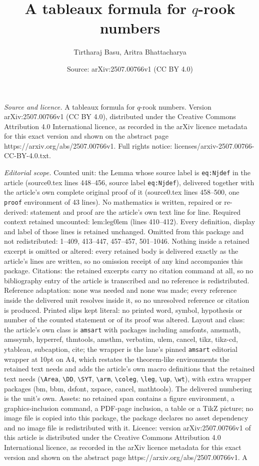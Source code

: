 \documentclass[10pt,a4paper]{amsart}
\title[A tableaux formula for $q$-rook numbers]{A tableaux formula for $q$-rook numbers}
\author{Tirtharaj Basu, Aritra Bhattacharya}
\date{Source: arXiv:2507.00766v1 (CC BY 4.0)}
\begin{document}
\maketitle

\noindent\emph{Source and licence.} A tableaux formula for $q$-rook numbers. Version arXiv:2507.00766v1 (CC BY 4.0), distributed under the Creative Commons Attribution 4.0 International licence, as recorded in the arXiv licence metadata for this exact version and shown on the abstract page https://arxiv.org/abs/2507.00766v1. Full rights notice: licenses/arxiv-2507.00766-CC-BY-4.0.txt.\par\smallskip

\noindent\textit{Editorial scope.} Counted unit: the Lemma whose source label is \texttt{eq:Njdef} in the article (source0.tex lines 448--456, source label \texttt{eq:Njdef}), delivered together with the article's own complete original proof of it (source0.tex lines 458--500, one \texttt{proof} environment of 43 lines). No mathematics is written, repaired or re-derived: statement and proof are the article's own text line for line. Required context retained uncounted: lem:leg0lem (lines 410--412). Every definition, display and label of those lines is retained unchanged. Omitted from this package and not redistributed: 1--409, 413--447, 457--457, 501--1046. Nothing inside a retained excerpt is omitted or altered: every retained body is delivered exactly as the article's lines are written, so no omission receipt of any kind accompanies this package. Citations: the retained excerpts carry no citation command at all, so no bibliography entry of the article is transcribed and no reference is redistributed. Reference adaptation: none was needed and none was made; every reference inside the delivered unit resolves inside it, so no unresolved reference or citation is produced. Printed slips kept literal: no printed word, symbol, hypothesis or number of the counted statement or of its proof was altered. Layout and class: the article's own class is \texttt{amsart} with packages including amsfonts, amsmath, amssymb, hyperref, thmtools, amsthm, verbatim, ulem, cancel, tikz, tikz-cd, ytableau, subcaption, cite; the wrapper is the lane's pinned \texttt{amsart} editorial wrapper at 10pt on A4, which restates the theorem-like environments the retained text needs and adds the article's own macro definitions that the retained text needs (\texttt{\textbackslash Area}, \texttt{\textbackslash DD}, \texttt{\textbackslash SYT}, \texttt{\textbackslash arm}, \texttt{\textbackslash coleg}, \texttt{\textbackslash leg}, \texttt{\textbackslash up}, \texttt{\textbackslash wt}), with extra wrapper packages (bm, bbm, dsfont, xspace, cancel, mathtools). The delivered numbering is the unit's own. Assets: no retained span contains a figure environment, a graphics-inclusion command, a PDF-page inclusion, a table or a TikZ picture; no image file is copied into this package, the package declares no asset dependency and no image file is redistributed with it. Licence: version arXiv:2507.00766v1 of this article is distributed under the Creative Commons Attribution 4.0 International licence, as recorded in the arXiv licence metadata for this exact version and shown on the abstract page https://arxiv.org/abs/2507.00766v1. A 
\end{document}
